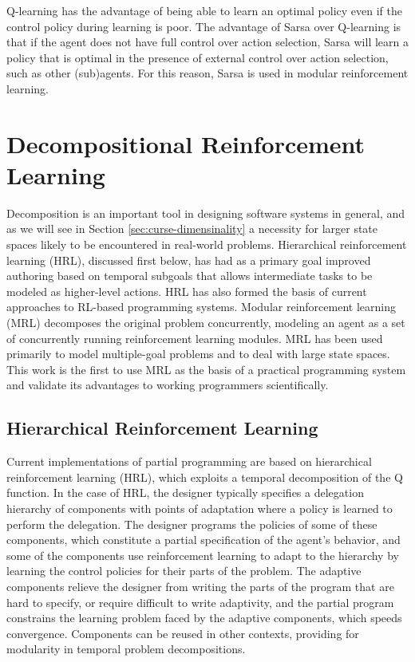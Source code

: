 Q-learning has the advantage of being able to learn an optimal policy even if the control policy during learning is poor. The advantage of Sarsa over Q-learning is that if the agent does not have full control over action selection, Sarsa will learn a policy that is optimal in the presence of external control over action selection, such as other (sub)agents. For this reason, Sarsa is used in modular reinforcement learning.

\section{Decompositional Reinforcement Learning}

Decomposition is an important tool in designing software systems in general, and as we will see in Section \ref{sec:curse-dimensinality} a necessity for larger state spaces likely to be encountered in real-world problems. Hierarchical reinforcement learning (HRL), discussed first below, has had as a primary goal improved authoring based on temporal subgoals that allows intermediate tasks to be modeled as higher-level actions. HRL has also formed the basis of current approaches to RL-based programming systems. Modular reinforcement learning (MRL) decomposes the original problem concurrently, modeling an agent as a set of concurrently running reinforcement learning modules. MRL has been used primarily to model multiple-goal problems and to deal with large state spaces. This work is the first to use MRL as the basis of a practical programming system and validate its advantages to working programmers scientifically.

\subsection{Hierarchical Reinforcement Learning}

Current implementations of partial programming are based on hierarchical reinforcement learning (HRL), which exploits a temporal decomposition of the Q function.  In the case of HRL, the designer typically specifies a delegation hierarchy of components with points of adaptation where a policy is learned to perform the delegation.  The designer programs the policies of some of these components, which constitute a partial specification of the agent's behavior, and some of the components use reinforcement learning to adapt to the hierarchy by learning the control policies for their parts of the problem.  The adaptive components relieve the designer from writing the parts of the program that are hard to specify, or require difficult to write adaptivity, and the partial program constrains the learning problem faced by the adaptive components, which speeds convergence.  Components can be reused in other contexts, providing for modularity in temporal problem decompositions.

